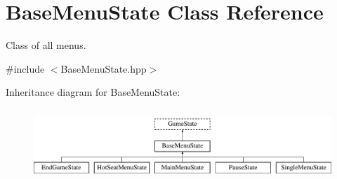 \hypertarget{class_base_menu_state}{}\section{Base\+Menu\+State Class Reference}
\label{class_base_menu_state}


Class of all menus.  




{\ttfamily \#include $<$Base\+Menu\+State.\+hpp$>$}

Inheritance diagram for Base\+Menu\+State\+:\begin{figure}[H]
\begin{center}
\leavevmode
\includegraphics[height=2.709677cm]{class_base_menu_state}
\end{center}
\end{figure}
